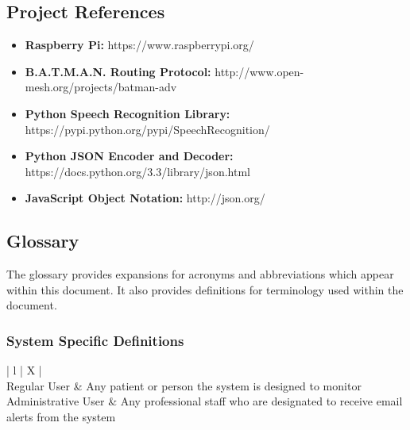 \documentclass[11pt,a4paper]{article}
\begin{document}
\subsection{Project References}
\begin{itemize}
	\item{\textbf{Raspberry Pi:}}
		\textnormal{https://www.raspberrypi.org/}
	\item{\textbf{B.A.T.M.A.N. Routing Protocol:}}
		\textnormal{http://www.open-mesh.org/projects/batman-adv}
	\item{\textbf{Python Speech Recognition Library:}}
		\textnormal{https://pypi.python.org/pypi/SpeechRecognition/}
	\item{\textbf{Python JSON Encoder and Decoder:}}
		\textnormal{https://docs.python.org/3.3/library/json.html}
    \item{\textbf{JavaScript Object Notation:}}
        \textnormal{http://json.org/}
\end{itemize}

\subsection{Glossary}
The glossary provides expansions for acronyms and abbreviations which appear within this document. It also provides definitions for terminology used within the document. 

\subsubsection{System Specific Definitions}
\begin{center}
\begin{tabularx}{\textwidth}{ | l | X | }
	\hline
	 \\
	\hline
		Regular User & Any patient or person the system is designed to monitor\\
		Administrative User & Any professional staff who are designated to receive email alerts from the system \\
	\hline
\end{tabularx}
\end{center}
\end{document}
